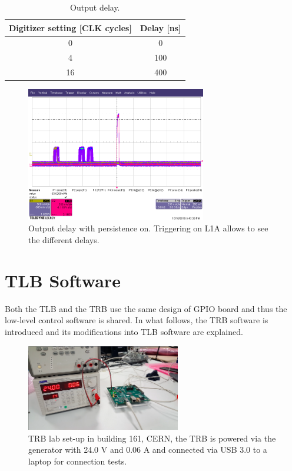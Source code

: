 \begin{table}
\caption{Output delay.}
\centering
\label{table:Outputtable}
\begin{tabular}{c c}
\toprule
Digitizer setting [CLK cycles] & Delay [ns] \\
\midrule
0 & 0\\
4 & 100\\
16 & 400\\
\bottomrule
\end{tabular}
\end{table}

\begin{figure}[htbp!] 
\centering    
\includegraphics[width=0.7\textwidth]{Digitizer_Delay.png}
\caption[Output Delay]{Output delay with persistence on. Triggering on L1A allows to see the different delays.}
\label{fig:OutputDelay}
\end{figure}


\chapter{TLB Software}

Both the TLB and the TRB use the same design of GPIO board and thus the low-level control software is shared. In what follows, the TRB software is introduced and its modifications into TLB software are explained.

\begin{figure}[htbp!] 
\centering    
\includegraphics[width=0.6\textwidth]{ChapterDAQ/Figs/Software/TLBwithPowerSupply.png}
\caption[TRB lab set-up]{TRB lab set-up in building 161, CERN, the TRB is powered via the generator with 24.0 V and 0.06 A and connected via USB 3.0 to a laptop for connection tests.}
\label{fig:TRBbdg161Setup}
\end{figure}


